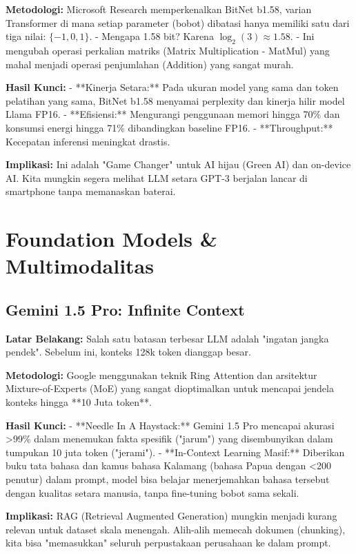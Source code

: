 \textbf{Metodologi:}
Microsoft Research memperkenalkan BitNet b1.58, varian Transformer di mana setiap parameter (bobot) dibatasi hanya memiliki satu dari tiga nilai: $\{-1, 0, 1\}$.
- Mengapa 1.58 bit? Karena $\log_2(3) \approx 1.58$.
- Ini mengubah operasi perkalian matriks (Matrix Multiplication - MatMul) yang mahal menjadi operasi penjumlahan (Addition) yang sangat murah.

\textbf{Hasil Kunci:}
- **Kinerja Setara:** Pada ukuran model yang sama dan token pelatihan yang sama, BitNet b1.58 menyamai perplexity dan kinerja hilir model Llama FP16.
- **Efisiensi:** Mengurangi penggunaan memori hingga 70\% dan konsumsi energi hingga 71\% dibandingkan baseline FP16.
- **Throughput:** Kecepatan inferensi meningkat drastis.

\textbf{Implikasi:}
Ini adalah "Game Changer" untuk AI hijau (Green AI) dan on-device AI. Kita mungkin segera melihat LLM setara GPT-3 berjalan lancar di smartphone tanpa memanaskan baterai.

\section{Foundation Models \& Multimodalitas}

\subsection{Gemini 1.5 Pro: Infinite Context \cite{geminiteam2024gemini}}

\textbf{Latar Belakang:}
Salah satu batasan terbesar LLM adalah "ingatan jangka pendek". Sebelum ini, konteks 128k token dianggap besar.

\textbf{Metodologi:}
Google menggunakan teknik Ring Attention dan arsitektur Mixture-of-Experts (MoE) yang sangat dioptimalkan untuk mencapai jendela konteks hingga **10 Juta token**.

\textbf{Hasil Kunci:}
- **Needle In A Haystack:** Gemini 1.5 Pro mencapai akurasi >99\% dalam menemukan fakta spesifik ("jarum") yang disembunyikan dalam tumpukan 10 juta token ("jerami").
- **In-Context Learning Masif:** Diberikan buku tata bahasa dan kamus bahasa Kalamang (bahasa Papua dengan <200 penutur) dalam prompt, model bisa belajar menerjemahkan bahasa tersebut dengan kualitas setara manusia, tanpa fine-tuning bobot sama sekali.

\textbf{Implikasi:}
RAG (Retrieval Augmented Generation) mungkin menjadi kurang relevan untuk dataset skala menengah. Alih-alih memecah dokumen (chunking), kita bisa "memasukkan" seluruh perpustakaan perusahaan ke dalam prompt.

